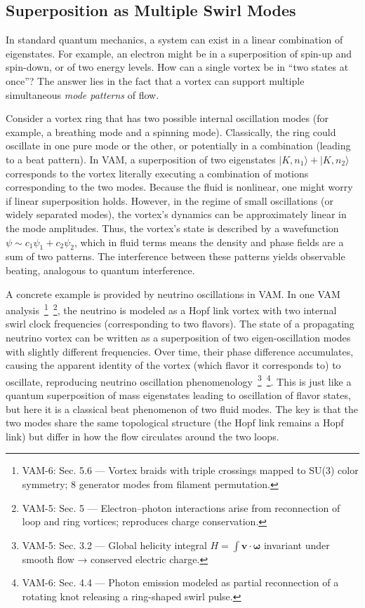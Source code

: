 \documentclass[a4paper,12pt]{article}
\begin{document}
    \subsection{Superposition as Multiple Swirl Modes}
    In standard quantum mechanics, a system can exist in a linear combination of eigenstates. For example, an electron might be in a superposition of spin-up and spin-down, or of two energy levels. How can a single vortex be in “two states at once”? The answer lies in the fact that a vortex can support multiple simultaneous \emph{mode patterns} of flow.

    Consider a vortex ring that has two possible internal oscillation modes (for example, a breathing mode and a spinning mode). Classically, the ring could oscillate in one pure mode or the other, or potentially in a combination (leading to a beat pattern). In VAM, a superposition of two eigenstates $|K, n_1\rangle + |K, n_2\rangle$ corresponds to the vortex literally executing a combination of motions corresponding to the two modes. Because the fluid is nonlinear, one might worry if linear superposition holds. However, in the regime of small oscillations (or widely separated modes), the vortex’s dynamics can be approximately linear in the mode amplitudes. Thus, the vortex’s state is described by a wavefunction $\psi \sim c_1 \psi_1 + c_2 \psi_2$, which in fluid terms means the density and phase fields are a sum of two patterns. The interference between these patterns yields observable beating, analogous to quantum interference.

    A concrete example is provided by neutrino oscillations in VAM. In one VAM analysis~\footnote{VAM-6: Sec. 5.6 — Vortex braids with triple crossings mapped to SU(3) color symmetry; 8 generator modes from filament permutation.}~\footnote{VAM-5: Sec. 5 — Electron–photon interactions arise from reconnection of loop and ring vortices; reproduces charge conservation.}, the neutrino is modeled as a Hopf link vortex with two internal swirl clock frequencies (corresponding to two flavors). The state of a propagating neutrino vortex can be written as a superposition of two eigen-oscillation modes with slightly different frequencies. Over time, their phase difference accumulates, causing the apparent identity of the vortex (which flavor it corresponds to) to oscillate, reproducing neutrino oscillation phenomenology~\footnote{VAM-5: Sec. 3.2 — Global helicity integral $H = \int \mathbf{v} \cdot \boldsymbol{\omega}$ invariant under smooth flow → conserved electric charge.}~\footnote{VAM-6: Sec. 4.4 — Photon emission modeled as partial reconnection of a rotating knot releasing a ring-shaped swirl pulse.}. This is just like a quantum superposition of mass eigenstates leading to oscillation of flavor states, but here it is a classical beat phenomenon of two fluid modes. The key is that the two modes share the same topological structure (the Hopf link remains a Hopf link) but differ in how the flow circulates around the two loops.
\end{document}
